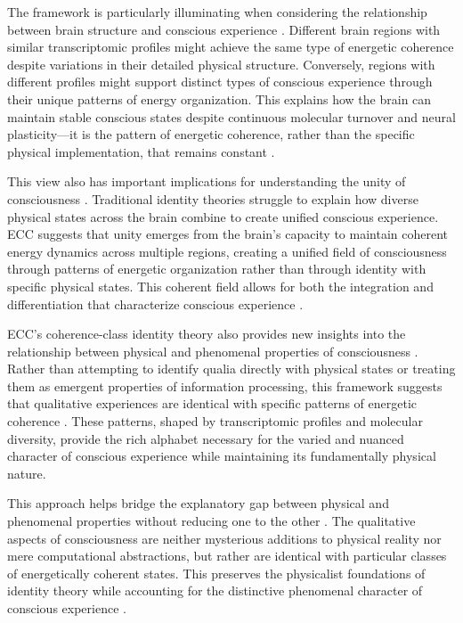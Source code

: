 The framework is particularly illuminating when considering the relationship between brain structure and conscious experience \cite{block1972what}. Different brain regions with similar transcriptomic profiles might achieve the same type of energetic coherence despite variations in their detailed physical structure. Conversely, regions with different profiles might support distinct types of conscious experience through their unique patterns of energy organization. This explains how the brain can maintain stable conscious states despite continuous molecular turnover and neural plasticity—it is the pattern of energetic coherence, rather than the specific physical implementation, that remains constant \cite{polger2009evaluating}.

This view also has important implications for understanding the unity of consciousness \cite{craver2007explaining}. Traditional identity theories struggle to explain how diverse physical states across the brain combine to create unified conscious experience. ECC suggests that unity emerges from the brain's capacity to maintain coherent energy dynamics across multiple regions, creating a unified field of consciousness through patterns of energetic organization rather than through identity with specific physical states. This coherent field allows for both the integration and differentiation that characterize conscious experience \cite{feigl1967mental}.

ECC's coherence-class identity theory also provides new insights into the relationship between physical and phenomenal properties of consciousness \cite{place1956is}. Rather than attempting to identify qualia directly with physical states or treating them as emergent properties of information processing, this framework suggests that qualitative experiences are identical with specific patterns of energetic coherence \cite{smart1959sensations}. These patterns, shaped by transcriptomic profiles and molecular diversity, provide the rich alphabet necessary for the varied and nuanced character of conscious experience while maintaining its fundamentally physical nature.

This approach helps bridge the explanatory gap between physical and phenomenal properties without reducing one to the other \cite{lewis1966argument}. The qualitative aspects of consciousness are neither mysterious additions to physical reality nor mere computational abstractions, but rather are identical with particular classes of energetically coherent states. This preserves the physicalist foundations of identity theory while accounting for the distinctive phenomenal character of conscious experience \cite{block1972what}.

